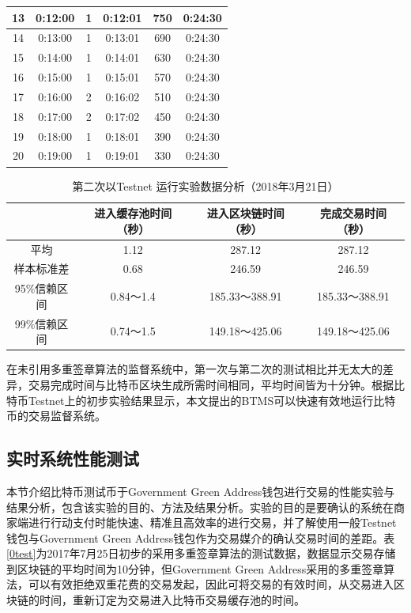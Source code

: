 \begin{enumerate}
\begin{table}[!htbp]
\begin{tabular}{|c|c|c|c|c|c|}
				13 & 0:12:00 & 1 & 0:12:01 & 750 & 0:24:30 \\ \hline
				14 & 0:13:00 & 1 & 0:13:01 & 690 & 0:24:30 \\ \hline
				15 & 0:14:00 & 1 & 0:14:01 & 630 & 0:24:30 \\ \hline
				16 & 0:15:00 & 1 & 0:15:01 & 570 & 0:24:30 \\ \hline
				17 & 0:16:00 & 2 & 0:16:02 & 510 & 0:24:30 \\ \hline
				18 & 0:17:00 & 2 & 0:17:02 & 450 & 0:24:30 \\ \hline
				19 & 0:18:00 & 1 & 0:18:01 & 390 & 0:24:30 \\ \hline
				20 & 0:19:00 & 1 & 0:19:01 & 330 & 0:24:30 \\ \hline
				\end{tabular}
				\end{table}

				\begin{table}[!htbp]
				\centering
				\caption{第二次以Testnet 运行实验数据分析（2018年3月21日）}
				\label{2general-1}
				\begin{tabular}{|c|c|c|c|}
				\hline
				         & 进入缓存池时间（秒） & 进入区块链时间（秒）    & 完成交易时间（秒）     \\ \hline
				平均       & 1.12       & 287.12        & 287.12        \\ \hline
				样本标准差    & 0.68       & 246.59        & 246.59        \\ \hline
				95\%信赖区间 & 0.84～1.4   & 185.33～388.91 & 185.33～388.91 \\ \hline
				99\%信赖区间 & 0.74～1.5   & 149.18～425.06 & 149.18～425.06 \\ \hline
				\end{tabular}
				\end{table}


		\end{enumerate}

			在未引用多重签章算法的监督系统中，第一次与第二次的测试相比并无太大的差异，交易完成时间与比特币区块生成所需时间相同，平均时间皆为十分钟。根据比特币Testnet上的初步实验结果显示，本文提出的BTMS可以快速有效地运行比特币的交易监督系统。


		\subsection{实时系统性能测试}
		本节介绍比特币测试币于Government Green Address钱包进行交易的性能实验与结果分析，包含该实验的目的、方法及结果分析。实验的目的是要确认的系统在商家端进行行动支付时能快速、精准且高效率的进行交易，并了解使用一般Testnet钱包与Government Green Address钱包作为交易媒介的确认交易时间的差距。表\ref{0test}为2017年7月25日初步的采用多重签章算法的测试数据，数据显示交易存储到区块链的平均时间为10分钟，但Government Green Address采用的多重签章算法，可以有效拒绝双重花费的交易发起，因此可将交易的有效时间，从交易进入区块链的时间，重新订定为交易进入比特币交易缓存池的时间。

